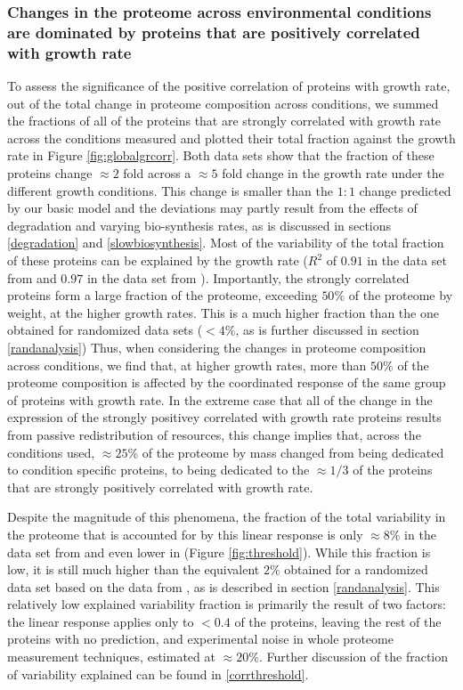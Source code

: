 \documentclass{article}
\newcommand{\hGlobalSumRsq}{0.91}
\newcommand{\vnGlobalSumRsq}{0.97}
\newcommand{\vGlobalSumRsq}{\vnGlobalSumRsq{}}
\begin{document}
\subsubsection{Changes in the proteome across environmental conditions are dominated by proteins that are positively correlated with growth rate}
To assess the significance of the positive correlation of proteins with growth rate, out of the total change in proteome composition across conditions, we summed the fractions of all of the proteins that are strongly correlated with growth rate across the conditions measured and plotted their total fraction against the growth rate in Figure \ref{fig:globalgrcorr}.
Both data sets show that the fraction of these proteins change $\approx 2$ fold across a $\approx 5$ fold change in the growth rate under the different growth conditions.
This change is smaller than the $1:1$ change predicted by our basic model and the deviations may partly result from the effects of degradation and varying bio-synthesis rates, as is discussed in sections \ref{degradation} and \ref{slowbiosynthesis}.
Most of the variability of the total fraction of these proteins can be explained by the growth rate ($R^2$ of $\hGlobalSumRsq$ in the data set from \cite{Schmidt2015} and $\vGlobalSumRsq$ in the data set from \cite{Peebo_2015}). 
Importantly, the strongly correlated proteins form a large fraction of the proteome, exceeding $50\%$ of the proteome by weight, at the higher growth rates.
This is a much higher fraction than the one obtained for randomized data sets ($<4\%$, as is further discussed in section \ref{randanalysis})
Thus, when considering the changes in proteome composition across conditions, we find that, at higher growth rates, more than $50\%$ of the proteome composition is affected by the coordinated response of the same group of proteins with growth rate.
In the extreme case that all of the change in the expression of the strongly positivey correlated with growth rate proteins results from passive redistribution of resources, this change implies that, across the conditions used, $\approx 25\%$ of the proteome by mass changed from being dedicated to condition specific proteins, to being dedicated to the $\approx 1/3$ of the proteins that are strongly positively correlated with growth rate.

Despite the magnitude of this phenomena, the fraction of the total variability in the proteome that is accounted for by this linear response is only $\approx 8\%$  in the data set from \cite{Schmidt2015} and even lower in \cite{Peebo_2015} (Figure \ref{fig:threshold}).
While this fraction is low, it is still much higher than the equivalent $2\%$ obtained for a randomized data set based on the data from \cite{Schmidt2015}, as is described in section \ref{randanalysis}.
This relatively low explained variability fraction is primarily the result of two factors: the linear response applies only to $<0.4$ of the proteins, leaving the rest of the proteins with no prediction, and experimental noise in whole proteome measurement techniques, estimated at $\approx20\%$.
Further discussion of the fraction of variability explained can be found in \ref{corrthreshold}.
\end{document}
